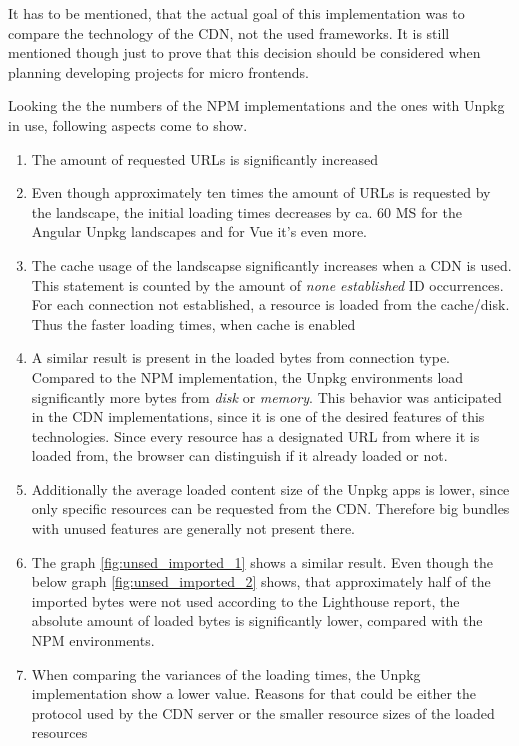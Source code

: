 It has to be mentioned, that the actual goal of this implementation was to compare the technology of the CDN, not the used frameworks. It is still mentioned though just to prove that this decision should be considered when planning developing projects for micro frontends. 

Looking the the numbers of the NPM implementations and the ones with Unpkg in use, following aspects come to show.

\begin{enumerate}
	\item The amount of requested URLs is significantly increased
	\item Even though approximately ten times the amount of URLs is requested by the landscape, the initial loading times decreases by ca. 60 MS for the Angular Unpkg landscapes and for Vue it's even more.
	\item The cache usage of the landscapse significantly increases when a CDN is used. This statement is counted by the amount of \textit{none established} ID occurrences. For each connection not established, a resource is loaded from the cache/disk. Thus the faster loading times, when cache is enabled
	\item A similar result is present in the loaded bytes from connection type. Compared to the NPM implementation, the Unpkg environments load significantly more bytes from \textit{disk} or \textit{memory}. This behavior was anticipated in the CDN implementations, since it is one of the desired features of this technologies. Since every resource has a designated URL from where it is loaded from, the browser can distinguish if it already loaded or not.
	\item Additionally the average loaded content size of the Unpkg apps is lower, since only specific resources can be requested from the CDN. Therefore big bundles with unused features are generally not present there.
	\item The graph \ref{fig:unsed_imported_1} shows a similar result. Even though the below graph \ref{fig:unsed_imported_2} shows, that approximately half of the imported bytes were not used according to the Lighthouse report, the absolute amount of loaded bytes is significantly lower, compared with the NPM environments.
	\item When comparing the variances of the loading times, the Unpkg implementation show a lower value. Reasons for that could be either the protocol used by the CDN server or the smaller resource sizes of the loaded resources
\end{enumerate}

